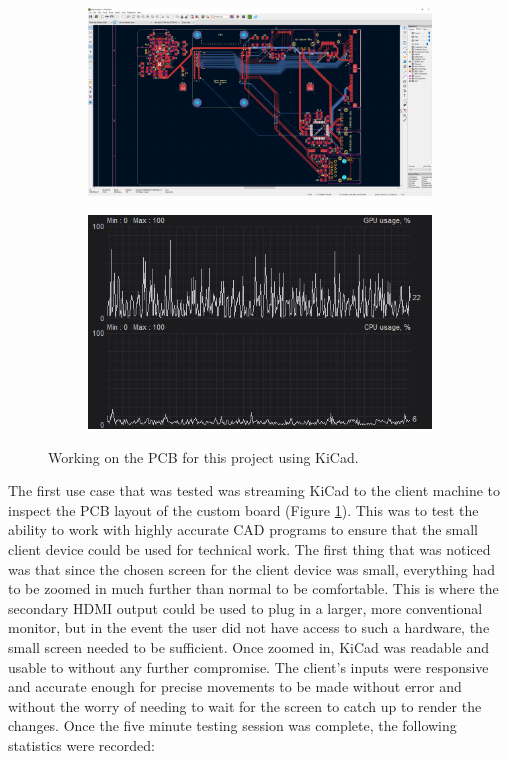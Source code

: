 \begin{figure}[t]
  \centering
  \begin{subfigure}{1\textwidth}
    \centering
    \includegraphics[width=.9\linewidth]{Figures/realworld/kicad}
  \end{subfigure}
  \begin{subfigure}{1\textwidth}
    \centering
    \includegraphics[width=.5\linewidth]{Figures/realworld/kicadstats}
  \end{subfigure}
  \caption[Streaming Electronics Design software]{Working on the PCB for this project using KiCad.}
  \label{fig:RealWorldKicad}
\end{figure}

The first use case that was tested was streaming KiCad to the client machine to inspect the PCB layout of the custom board (Figure \ref{fig:RealWorldKicad}).
This was to test the ability to work with highly accurate CAD programs to ensure that the small client device could be used for technical work.
The first thing that was noticed was that since the chosen screen for the client device was small, everything had to be zoomed in much further than normal to be comfortable.
This is where the secondary HDMI output could be used to plug in a larger, more conventional monitor, but in the event the user did not have access to such a hardware, the small screen needed to be sufficient.
Once zoomed in, KiCad was readable and usable to without any further compromise.
The client's inputs were responsive and accurate enough for precise movements to be made without error and without the worry of needing to wait for the screen to catch up to render the changes.
Once the five minute testing session was complete, the following statistics were recorded:


